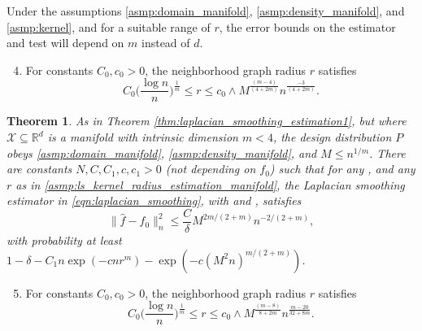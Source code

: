 \documentclass[twoside]{article}
\newcommand{\Reals}{\mathbb{R}}
\newcommand{\1}{\mathbf{1}}
\newcommand{\Rd}{\Reals^d}
\newcommand{\Xset}{\mathcal{X}}
\newcommand{\wh}[1]{\widehat{#1}}
\newtheorem{theorem}{Theorem}
\theoremstyle{definition}
\theoremstyle{remark}
\begin{document}
Under the assumptions \ref{asmp:domain_manifold}, \ref{asmp:density_manifold}, and \ref{asmp:kernel}, and for a suitable range of $r$, the error bounds on the estimator \smash{$\wh{f}$} and test \smash{$\wh{\varphi}$} will depend on $m$ instead of $d$. 
\begin{enumerate}[label=(R\arabic*)]
	\setcounter{enumi}{3}
	\item 
	\label{asmp:ls_kernel_radius_estimation_manifold}
	For constants $C_0,c_0>0$, the neighborhood graph radius $r$ satisfies 
	\begin{equation*}
	C_0\biggl(\frac{\log n}{n}\biggr)^{\frac{1}{m}} \leq r \leq c_0 \wedge  M^{\frac{(m - 4)}{(4 + 2m)}} n^{\frac{-3}{(4 + 2m)}}.
	\end{equation*}
\end{enumerate}

\begin{theorem}
	\label{thm:laplacian_smoothing_estimation_manifold}
	As in Theorem \ref{thm:laplacian_smoothing_estimation1}, but where $\Xset \subseteq \Rd$ is a manifold with intrinsic dimension $m < 4$, the design distribution $P$ obeys \ref{asmp:domain_manifold}, \ref{asmp:density_manifold}, and $M \leq n^{1/m}$. There are constants $N,C,C_1,c,c_1>0$ (not depending on $f_0$) such that for any , and any $r$ as in \ref{asmp:ls_kernel_radius_estimation_manifold}, the Laplacian smoothing estimator \smash{$\wh{f}$} in \eqref{eqn:laplacian_smoothing}, with  and , satisfies
	\begin{equation*}
	\bigl\|\wh{f} - f_0\bigr\|_n^2 \leq \frac{C}{\delta} M^{2m/(2 + m)} n^{-2/(2 + m)},
	\end{equation*}
	with probability at least $1 - \delta -  C_1 n\exp(-cnr^m) - \exp(-c(M^2n)^{m/(2+m)})$.
\end{theorem}

\begin{enumerate}[label=(R\arabic*)]
	\setcounter{enumi}{4}
	\item 
	\label{asmp:ls_kernel_radius_testing_manifold}
	For constants $C_0,c_0>0$, the neighborhood graph radius $r$ satisfies 
	\begin{equation*}
	C_0\biggl(\frac{\log n}{n}\biggr)^{\frac{1}{m}} \leq r \leq c_0 \wedge M^{\frac{(m - 8)}{8 + 2m}} n^{\frac{m - 20}{32 + 8m}}.
	\end{equation*}
\end{enumerate}
\end{document}
